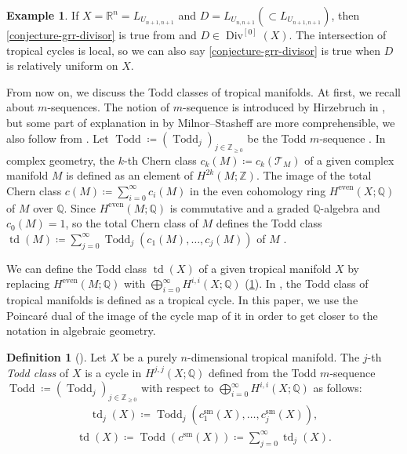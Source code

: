\documentclass[a4paper,dvipdfmx,reqno,12pt]{amsart}
\theoremstyle{definition}
\newtheorem{definition}[theorem]{Definition}
\newtheorem{example}[theorem]{Example}
\newcommand{\deq}{\coloneqq}
\newcommand{\opn}[1]{\operatorname{#1}}
\numberwithin{equation}{section}
\begin{document}
\begin{example}
If $X=\mathbb{R}^{n}=L_{U_{n+1,n+1}}$ and 
$D= L_{U_{n,n+1}}(\subset L_{U_{n+1,n+1}})$,
then \cref{conjecture-grr-divisor} is true
from \cite[Example 2.10]{MR3999674} 
and $D\in \opn{Div}^{[0]}(X)$.
The intersection of tropical cycles
is local, so we can also say
\cref{conjecture-grr-divisor} is true
when $D$ is relatively uniform on $X$.
\end{example}

From now on, we discuss the Todd classes of
tropical manifolds.
At first, we recall about $m$-sequences.
The notion of $m$-sequence is introduced
by Hirzebruch in \cite[]{MR1335917},
but some part of explanation in
\cite[]{MR440554}
by Milnor--Stasheff are more comprehensible,
we also follow from \cite[]{MR440554}.
Let $\opn{Todd}\deq 
(\opn{Todd}_j)_{j\in \mathbb{Z}_{\geq 0}}$ be 
the Todd $m$-sequence \cite[]{MR1335917}.
In complex geometry, the $k$-th Chern class
$c_k(M)\deq c_k(\mathcal{T}_M)$ of
a given complex manifold $M$ is defined
as an element of $H^{2k}(M;\mathbb{Z})$.
The image of the total Chern class 
$c(M)\deq \sum_{i=0}^{\infty}c_i(M)$
in the even cohomology ring $H^{\mathrm{even}}(X;\mathbb{Q})$
of $M$ over $\mathbb{Q}$.
Since $H^{\mathrm{even}}(M;\mathbb{Q})$
is commutative and a graded $\mathbb{Q}$-algebra
and $c_0(M)=1$,
so the total Chern class of $M$ defines 
the Todd class $\opn{td}(M)\deq \sum_{j=0}^{\infty}
\opn{Todd}_j(c_{1}(M),\ldots,c_{j}(M))$ of $M$
\cite[]{MR1335917}.
 
We can define the Todd class
$\opn{td}(X)$ of a given tropical manifold
$X$ by replacing 
$H^{\mathrm{even}}(M;\mathbb{Q})$ with
$\bigoplus_{i=0}^{\infty} H^{i,i}(X;\mathbb{Q})$
(\cref{definition-tropical-todd}).
In \cite[Conjecture 6.13]{demedrano2023chern},
the Todd class of tropical manifolds is
defined as a tropical cycle.
In this paper, we use the Poincar\'e dual of the image 
of the cycle map of it
in order to get closer to the notation 
in algebraic geometry.

\begin{definition}[{\cite[]{demedrano2023chern}}]
\label{definition-tropical-todd}
Let $X$ be a purely $n$-dimensional tropical manifold.
The $j$-th \emph{Todd class} of $X$ is
a cycle in $H^{j,j}(X;\mathbb{Q})$
defined from 
the Todd $m$-sequence 
$\opn{Todd}\deq (\opn{Todd}_j)_{j\in \mathbb{Z}_{\geq 0}}$
with respect to $\bigoplus_{i=0}^{\infty}
H^{i,i}(X;\mathbb{Q})$ as follows:
\begin{align}
\opn{td}_j(X)\deq \opn{Todd}_j(c_{1}^{\mathrm{sm}}(X),
\ldots,c_{j}^{\mathrm{sm}}(X)),
\end{align}
\begin{align}
\opn{td}(X)\deq
\opn{Todd}(c^{\mathrm{sm}}(X))\deq
\sum_{j=0}^{\infty}\opn{td}_j(X).
\end{align}

\end{definition}
\end{document}

